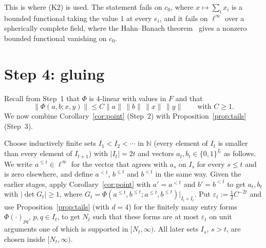 \documentclass[11pt]{amsart}
\theoremstyle{remark}
\newcommand{\linf}{\ell^\infty}
\newcommand{\N}{\mathbb{N}}
\newcommand{\abs}[1]{\lvert #1\rvert}
\newcommand{\norm}[1]{\lVert #1\rVert}
\newcommand{\1}{\mathbf{1}}
\begin{document}
This is where (K2) is used. The statement fails on $c_0$, where $x\mapsto\sum_ix_i$ is a bounded functional taking the value
$1$ at every $e_i$, and it fails on $\linf$ over a spherically complete field, where the Hahn--Banach theorem~\cite{In}
gives a nonzero bounded functional vanishing on $c_0$.

\section{Step 4: gluing}\label{sec:step4}
Recall from Step~1 that $\Phi$ is $4$-linear with values in $F$ and that
\begin{equation}\label{eq:Phibound}
\norm{\Phi(a,b;x,y)}\le C\norm a\,\norm b\,\norm x\,\norm y\qquad\text{with }C\ge1 .
\end{equation}
We now combine Corollary~\ref{cor:point} (Step~2) with
Proposition~\ref{prop:tails} (Step~3).

Choose inductively finite sets $I_1<I_2<\cdots$ in $\N$ (every element of $I_t$ is smaller than every element of
$I_{t+1}$) with $\abs{I_t}=2t$ and vectors $a_t,b_t\in\{0,1\}^{I_t}$ as follows.
We write $a^{\le t}\in\linf$ for the vector that agrees with $a_s$ on $I_s$ for every $s\le t$ and is zero elsewhere, and define
$a^{<t}$, $b^{\le t}$ and $b^{<t}$ in the same way.
Given the earlier stages, apply Corollary~\ref{cor:point} with $a'=a^{<t}$ and $b'=b^{<t}$ to get $a_t,b_t$ with
$\abs{\det G_t}\ge1$, where $G_t=\Phi(a^{\le t},b^{\le t};a^{\le t},b^{\le t})|_{I_t\times I_t}$. Put $\varepsilon_t:=\tfrac12C^{-2t}$ and use
Proposition~\ref{prop:tails} (with $d=4$) for the finitely many entry forms $\Phi(\cdot)_{pq}$, $p,q\in I_t$, to get $N_t$ such that
these forms are at most $\varepsilon_t$ on unit arguments one of which is supported in $[N_t,\infty)$. All later sets $I_s$, $s>t$, are
chosen inside $[N_t,\infty)$.
\end{document}
